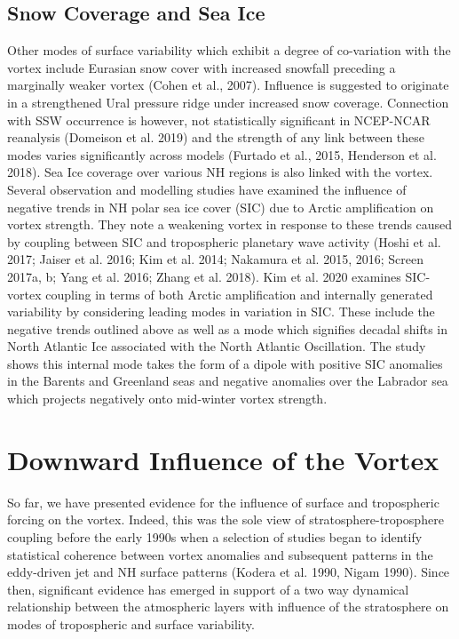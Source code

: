 \subsection{Snow Coverage and Sea Ice}
\label{sec:external_influence_snow_ice}

Other modes of surface variability which exhibit a degree of co-variation with the vortex include Eurasian snow cover with increased snowfall preceding a marginally weaker vortex (Cohen et al., 2007). Influence is suggested to originate in a strengthened Ural pressure ridge under increased snow coverage. Connection with SSW occurrence is however, not statistically significant in NCEP-NCAR reanalysis (Domeison et al. 2019) and the strength of any link between these modes varies significantly across models (Furtado et al., 2015, Henderson et al. 2018). 
Sea Ice coverage over various NH regions is also linked with the vortex. Several observation and modelling studies have examined the influence of negative trends in NH polar sea ice cover (SIC) due to Arctic amplification on vortex strength. They note a weakening vortex in response to these trends caused by coupling between SIC and tropospheric planetary wave activity (Hoshi et al. 2017; Jaiser et al. 2016; Kim et al. 2014; Nakamura et al. 2015, 2016; Screen 2017a, b; Yang et al. 2016; Zhang et al. 2018). Kim et al. 2020 examines SIC-vortex coupling in terms of both Arctic amplification and internally generated variability by considering leading modes in variation in SIC. These include the negative trends outlined above as well as a mode which signifies decadal shifts in North Atlantic Ice associated with the North Atlantic Oscillation. The study shows this internal mode takes the form of a dipole with positive SIC anomalies in the Barents and Greenland seas and negative anomalies over the Labrador sea which projects negatively onto mid-winter vortex strength. 

\section{Downward Influence of the Vortex}
\label{sec:Downward_influence}
So far, we have presented evidence for the influence of surface and tropospheric forcing on the vortex. Indeed, this was the sole view of stratosphere-troposphere coupling before the early 1990s when a selection of studies began to identify statistical coherence between vortex anomalies and subsequent patterns in the eddy-driven jet and NH surface patterns (Kodera et al. 1990, Nigam 1990). Since then, significant evidence has emerged in support of a two way dynamical relationship between the atmospheric layers with influence of the stratosphere on modes of tropospheric and surface variability.


